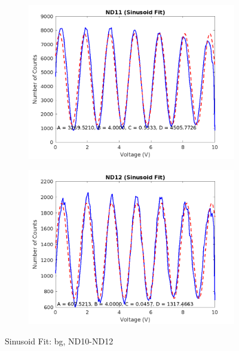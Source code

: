\documentclass{article}
\numberwithin{equation}{section}
\begin{document}
\begin{figure}[h]
\begin{subfigure}[b]{0.45\textwidth}
        \includegraphics[width=\textwidth]{ND11_sinusoid_fit.png}
    \end{subfigure}
    \hfill
    \begin{subfigure}[b]{0.45\textwidth}
        \includegraphics[width=\textwidth]{ND12_sinusoid_fit.png}
    \end{subfigure}
    \caption{Sinusoid Fit: bg, ND10-ND12}
    \label{fig:bg-ND12}
\end{figure}
\end{document}
